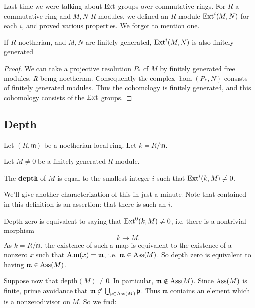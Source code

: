 Last time we were talking about $\mathrm{Ext}$ groups over commutative
rings. For $R$ a
commutative ring and $M,N$ $R$-modules, we defined an $R$-module
$\mathrm{Ext}^i(M,N)$ for
each $i$, and proved various properties. We forgot to mention
one.

\begin{proposition}
If $R$ noetherian, and $M,N$ are finitely generated,
$\mathrm{Ext}^i(M,N)$ is also finitely generated
\end{proposition}
\begin{proof}
We can take a projective resolution $P_*$ of $M$ by finitely
generated free modules, $R$ being
noetherian. Consequently the complex $\hom(P_*, N)$ consists of
finitely
generated modules. Thus the cohomology is finitely generated,
and this cohomology
consists of the $\mathrm{Ext}$ groups.
\end{proof}


\subsection{Depth} Let $(R, \mathfrak{m})$ be  a noetherian
local ring. Let $k = R/\mathfrak{m}$.

Let $M \neq 0$ be a finitely generated $R$-module.

\newcommand{\depth}{\mathrm{depth}}
\begin{definition}
The \textbf{depth} of $M$ is equal to the smallest integer $i$
such that
$\mathrm{Ext}^i(k,M) \neq 0$.
\end{definition}

We'll give another characterization of this in just a minute.
Note that
contained in this definition is an assertion: that there is such
an $i$.

\begin{example}
Depth zero is equivalent to saying that $\mathrm{Ext}^0(k,M) \neq 0$,
i.e. there is a
nontrivial morphism
\[ k \to M.  \]
As $k = R/\mathfrak{m}$, the existence of such a map is
equivalent to the existence of a nonzero $x$
such that $\operatorname{Ann}(x) = \mathfrak{m}$, i.e. $\mathfrak{m} \in
\operatorname{Ass}(M)$. So depth
zero is equivalent to having $\mathfrak{m} \in \operatorname{Ass}(M)$.
\end{example}

Suppose now that $\depth(M) \neq 0$. In particular,
$\mathfrak{m} \notin
\operatorname{Ass}(M)$. Since $\operatorname{Ass}(M)$ is finite, prime avoidance that
$\mathfrak{m}
\not\subset \bigcup_{\mathfrak{p} \in \operatorname{Ass}(M)} \mathfrak{p}$.
Thus
$\mathfrak{m}$ contains an element which is a nonzerodivisor on
$M$. So we find:

